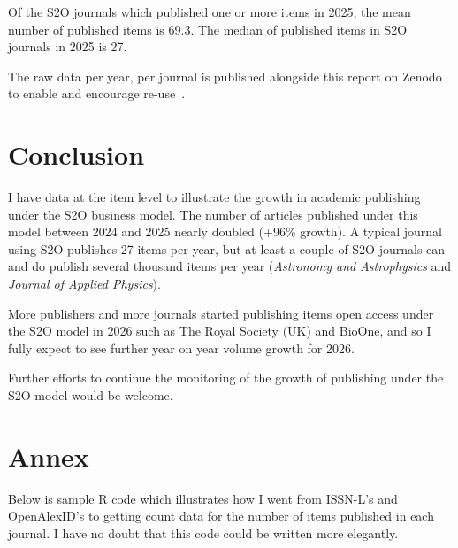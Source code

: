 \documentclass[10pt,a4paper]{article}
\begin{document}
Of the S2O journals which published one or more items in 2025, the mean number of published items is 69.3. The median of published items in S2O journals in 2025 is 27.

The raw data per year, per journal is published alongside this report on Zenodo to enable and encourage re-use~\citep{mounce2026}.

\section{Conclusion}
I have data at the item level to illustrate the growth in academic publishing under the S2O business model. The number of articles published under this model between 2024 and 2025 nearly doubled (+96\% growth). A typical journal using S2O publishes 27 items per year, but at least a couple of S2O journals can and do publish several thousand items per year (\textit{Astronomy and Astrophysics} and \textit{Journal of Applied Physics}).

More publishers and more journals started publishing items open access under the S2O model in 2026 such as The Royal Society (UK) and BioOne, and so I fully expect to see further year on year volume growth for 2026.

Further efforts to continue the monitoring of the growth of publishing under the S2O model would be welcome.\\



\section{Annex}

Below is sample R code which illustrates how I went from ISSN-L's and OpenAlexID's to getting count data for the number of items published in each journal. I have no doubt that this code could be written more elegantly.
\end{document}
